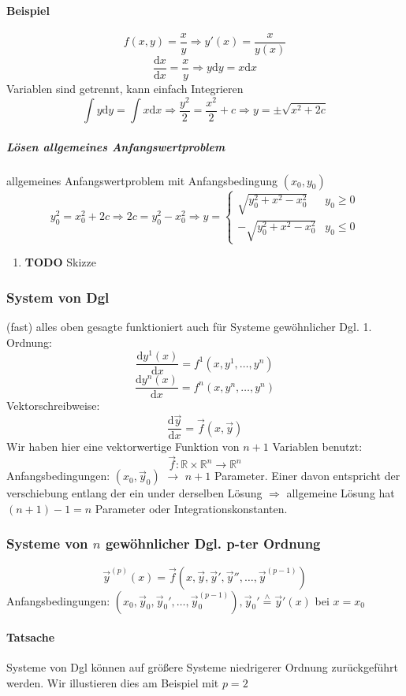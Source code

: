 \documentclass[a4paper]{scrartcl}
\newcommand{\estimates}{\overset{\scriptscriptstyle\wedge}{=}}
\renewcommand{\d}{\mathrm{d}}
\newcommand{\f}[2]{\frac{#1}{#2}}
\renewcommand{\v}[1]{\vec{#1}}
\theoremstyle{definition}
\theoremstyle{plain}
\theoremstyle{remark}
\begin{document}
\paragraph{Beispiel}
\label{sec-3-3-6-1}
\[f(x,y) = \f{x}{y} \Rightarrow y'(x) = \f{x}{y(x)}\]
\[\f{\d x}{\d x} = \f{x}{y} \Rightarrow y\d y = x\d x\]
Variablen sind getrennt, kann einfach Integrieren
\[\int y\d y = \int x\d x \Rightarrow \f{y^2}{2} = \f{x^2}{2} + c \Rightarrow y = \pm \sqrt{x^2 + 2c}\]
\subparagraph{Lösen allgemeines Anfangswertproblem}
\label{sec-3-3-6-1-1}
allgemeines Anfangswertproblem mit Anfangsbedingung $(x_0,y_0)$
\[y_0^2 = x_0^2 + 2c \Rightarrow 2c = y_0^2 - x_0^2 \Rightarrow y = \begin{cases} \sqrt{y_0^2 + x^2 - x_0^2} & y_0 \geq 0 \\ -\sqrt{y_0^2 + x^2 - x_0^2} & y_0 \leq 0 \end{cases}\]
\begin{enumerate}
\item {\bfseries\sffamily TODO} Skizze
\label{sec-3-3-6-1-1-1}
\end{enumerate}
\subsubsection{System von Dgl}
\label{sec-3-3-7}
(fast) alles oben gesagte funktioniert auch für Systeme gewöhnlicher Dgl. 1. Ordnung:
\[\f{\d y^1(x)}{\d x} = f^1(x,y^1,\ldots,y^n)\]
\[\f{\d y^n(x)}{\d x} = f^n(x,y^n,\ldots,y^n)\]
Vektorschreibweise:
\[\f{\d \v y}{\d x} = \v f(x,\v y)\]
Wir haben hier eine vektorwertige Funktion von $n+1$ Variablen benutzt:
\[\v f:\mathbb{R}\times\mathbb{R}^n\to \mathbb{R}^n\]
Anfangsbedingungen: $(x_0,\v{y}_0)$ $\rightarrow$ $n+1$ Parameter. Einer davon entspricht der verschiebung entlang der ein under derselben Lösung $\Rightarrow$ allgemeine Lösung hat $(n + 1) - 1 = n$ Parameter oder Integrationskonstanten.
\subsubsection{Systeme von $n$ gewöhnlicher Dgl. p-ter Ordnung}
\label{sec-3-3-8}
\[\v{y}^{(p)}(x) = \v f(x,\v y,\v{y}',\v{y}'',\ldots,\v{y}^{(p-1)})\]
Anfangsbedingungen: $(x_0,\v{y}_0,\v{y}_0',\ldots,\v{y}_0^{(p - 1)}),\v{y}_0' \estimates \v{y}'(x)$ bei $x = x_0$ \\
\paragraph{Tatsache}
\label{sec-3-3-8-1}
Systeme von Dgl können auf größere Systeme niedrigerer Ordnung zurückgeführt werden.
Wir illustieren dies am Beispiel mit $p = 2$
\end{document}
